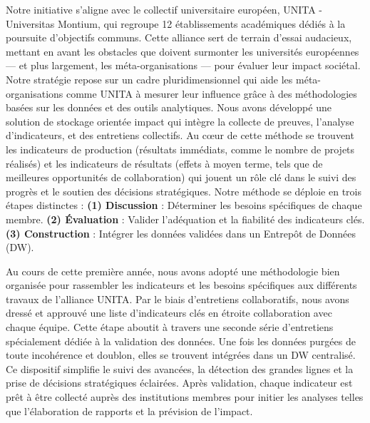 Notre initiative s'aligne avec le collectif universitaire européen, UNITA - Universitas Montium, qui regroupe 12 établissements académiques dédiés à la poursuite d'objectifs communs. Cette alliance sert de terrain d'essai audacieux, mettant en avant les obstacles que doivent surmonter les universités européennes — et plus largement, les méta-organisations — pour évaluer leur impact sociétal. Notre stratégie repose sur un cadre pluridimensionnel qui aide les méta-organisations comme UNITA à mesurer leur influence grâce à des méthodologies basées sur les données et des outils analytiques. Nous avons développé une solution de stockage orientée impact qui intègre la collecte de preuves, l'analyse d'indicateurs, et des entretiens collectifs. Au cœur de cette méthode se trouvent les indicateurs de production (résultats immédiats, comme le nombre de projets réalisés) et les indicateurs de résultats (effets à moyen terme, tels que de meilleures opportunités de collaboration) qui jouent un rôle clé dans le suivi des progrès et le soutien des décisions stratégiques. Notre méthode se déploie en trois étapes distinctes : \textbf{ (1) Discussion} : Déterminer les besoins spécifiques de chaque membre. \textbf{(2) Évaluation} : Valider l'adéquation et la fiabilité des indicateurs clés. \textbf{(3) Construction} : Intégrer les données validées dans un Entrepôt de Données (DW). 

Au cours de cette première année, nous avons adopté une méthodologie bien organisée pour rassembler les indicateurs et les besoins spécifiques aux différents travaux de l'alliance UNITA. Par le biais d'entretiens collaboratifs, nous avons dressé et approuvé une liste d'indicateurs clés en étroite collaboration avec chaque équipe. Cette étape aboutit à travers une seconde série d'entretiens spécialement dédiée à la validation des données. Une fois les données purgées de toute incohérence et doublon, elles se trouvent intégrées dans un DW centralisé. Ce dispositif simplifie le suivi des avancées, la détection des grandes lignes et la prise de décisions stratégiques éclairées. Après validation, chaque indicateur est prêt à être collecté auprès des institutions membres pour initier les analyses telles que l'élaboration de rapports et la prévision de l'impact. 
